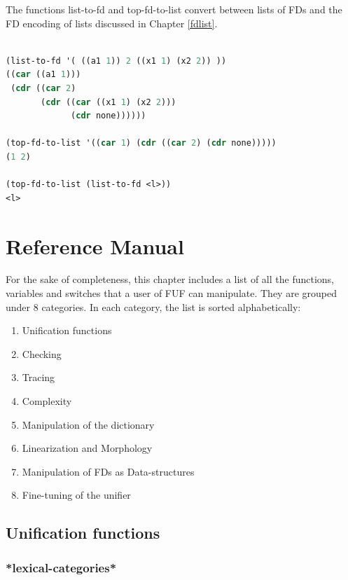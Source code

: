 \documentclass[10pt,a4paper]{report}
\begin{document}
The functions list-to-fd and top-fd-to-list convert between lists of FDs
and the FD encoding of lists discussed in Chapter \ref{fdlist}.  


\begin{lstlisting}[language=Lisp]

(list-to-fd '( ((a1 1)) 2 ((x1 1) (x2 2)) ))
((car ((a1 1)))
 (cdr ((car 2)
       (cdr ((car ((x1 1) (x2 2)))
             (cdr none))))))

(top-fd-to-list '((car 1) (cdr ((car 2) (cdr none)))))
(1 2)

(top-fd-to-list (list-to-fd <l>)) 
<l>

\end{lstlisting}
         


\chapter{Reference Manual}
\label{reference}

For the sake of completeness, this chapter includes a list of all the
functions, variables and switches that a user of FUF can manipulate. They
are grouped under 8 categories. In each category, the list is sorted
alphabetically: 
\begin{enumerate}
\item Unification functions

\item Checking

\item Tracing

\item Complexity

\item Manipulation of the dictionary

\item Linearization and Morphology

\item Manipulation of FDs as Data-structures

\item Fine-tuning of the unifier
\end{enumerate}


\section{Unification functions}

\subsection{*lexical-categories*}
\end{document}

